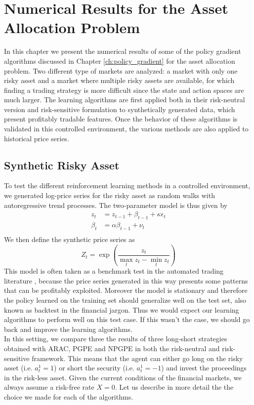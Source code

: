 \chapter{Numerical Results for the Asset Allocation Problem}

In this chapter we present the numerical results of some of the policy gradient algorithms discussed in Chapter \ref{ch:policy_gradient} for the asset allocation problem. Two different type of markets are analyzed: a market with only one risky asset and a market where multiple risky assets are available, for which finding a trading strategy is more difficult since the state and action spaces are much larger. The learning algorithms are first applied both in their risk-neutral version and risk-sensitive formulation to synthetically generated data, which present profitably tradable features. Once the behavior of these algorithms is validated in this controlled environment, the various methods are also applied to historical price series. 

\section{Synthetic Risky Asset}
To test the different reinforcement learning methods in a controlled environment, we generated log-price series for the risky asset as random walks with autoregressive trend processes. The two-parameter model is thus given by
\begin{equation*}
	\begin{split}
		z_t &= z_{t-1} + \beta_{t-1} + \kappa \epsilon_t\\
		\beta_t &= \alpha \beta_{t-1} + \nu_t\\
	\end{split}
\end{equation*}
We then define the synthetic price series as
\begin{equation*}
	Z_t = \exp\left(\frac{z_t}{\max_t z_t - \min_t z_t}\right)
\end{equation*}
This model is often taken as a benchmark test in the automated trading literature \cite{moody1998performance}, because the price series generated in this way presents some patterns that can be profitably exploited. Moreover the model is stationary and therefore the policy learned on the training set should generalize well on the test set, also known as backtest in the financial jargon. Thus we would expect our learning algorithms to perform well on this test case. If this wasn't the case, we should go back and improve the learning algorithms.\\
In this setting, we compare three the results of three long-short strategies obtained with ARAC, PGPE and NPGPE in both the risk-neutral and risk-sensitive framework. This means that the agent can either go long on the risky asset (i.e. $a_t^1 = 1$) or short the security (i.e. $a_t^1 = -1$) and invest the proceedings in the risk-less asset. Given the current conditions of the financial markets, we always assume a risk-free rate $X = 0$. Let us describe in more detail the the choice we made for each of the algorithms. 


